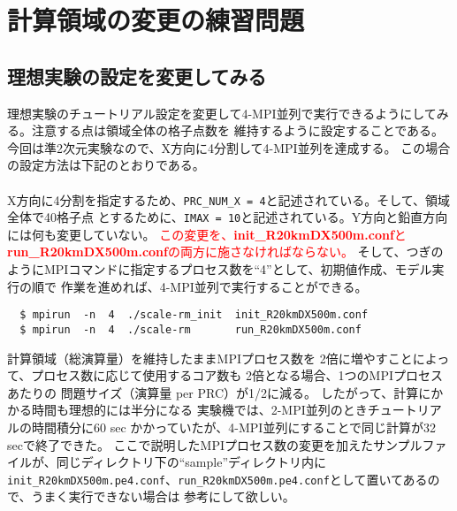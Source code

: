 \chapter{計算領域の変更の練習問題}


\section{理想実験の設定を変更してみる}


理想実験のチュートリアル設定を変更して4-MPI並列で実行できるようにしてみる。注意する点は領域全体の格子点数を
維持するように設定することである。今回は準2次元実験なので、X方向に4分割して4-MPI並列を達成する。
この場合の設定方法は下記のとおりである。\\

\\

\noindent X方向に4分割を指定するため、\verb|PRC_NUM_X = 4|と記述されている。そして、領域全体で40格子点
とするために、\verb|IMAX = 10|と記述されている。Y方向と鉛直方向には何も変更していない。
\textcolor{red}{この変更を、{\bf init\_R20kmDX500m.conf}と{\bf run\_R20kmDX500m.conf}の両方に施さなければならない。}
そして、つぎのようにMPIコマンドに指定するプロセス数を``4''として、初期値作成、モデル実行の順で
作業を進めれば、4-MPI並列で実行することができる。
\begin{verbatim}
  $ mpirun  -n  4  ./scale-rm_init  init_R20kmDX500m.conf
  $ mpirun  -n  4  ./scale-rm       run_R20kmDX500m.conf
\end{verbatim}

計算領域（総演算量）を維持したままMPIプロセス数を
2倍に増やすことによって、プロセス数に応じて使用するコア数も
2倍となる場合、1つのMPIプロセスあたりの
問題サイズ（演算量 per PRC）が1/2に減る。
したがって、計算にかかる時間も理想的には半分になる
実験機では、2-MPI並列のときチュートリアルの時間積分に60 sec かかっていたが、4-MPI並列にすることで同じ計算が32 secで終了できた。
ここで説明したMPIプロセス数の変更を加えたサンプルファイルが、同じディレクトリ下の``sample''ディレクトリ内に
\verb|init_R20kmDX500m.pe4.conf|、\verb|run_R20kmDX500m.pe4.conf|として置いてあるので、うまく実行できない場合は
参考にして欲しい。


